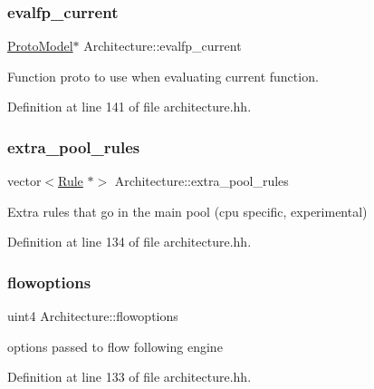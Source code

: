 \subsubsection{\texorpdfstring{evalfp\_current}{evalfp\_current}}
{\footnotesize\ttfamily \mbox{\hyperlink{class_proto_model}{Proto\+Model}}$\ast$ Architecture\+::evalfp\+\_\+current}



Function proto to use when evaluating current function. 



Definition at line 141 of file architecture.\+hh.

\mbox{\label{class_architecture_a6218d36328733cd9798ad6c3dbe921d8}} 
\subsubsection{\texorpdfstring{extra\_pool\_rules}{extra\_pool\_rules}}
{\footnotesize\ttfamily vector$<$\mbox{\hyperlink{class_rule}{Rule}} $\ast$$>$ Architecture\+::extra\+\_\+pool\+\_\+rules}



Extra rules that go in the main pool (cpu specific, experimental) 



Definition at line 134 of file architecture.\+hh.

\mbox{\label{class_architecture_a4ed18744b8dc08d3ca81d6b1b6df682e}} 
\subsubsection{\texorpdfstring{flowoptions}{flowoptions}}
{\footnotesize\ttfamily uint4 Architecture\+::flowoptions}



options passed to flow following engine 



Definition at line 133 of file architecture.\+hh.

\mbox{\label{class_architecture_af1b94f4312717f6cd89eb784e3e73611}} 
